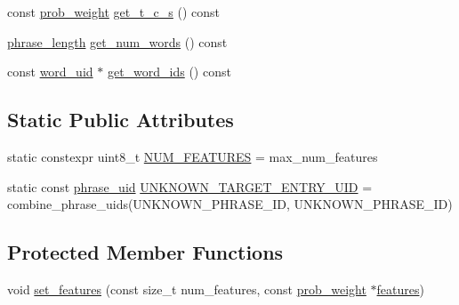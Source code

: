 \begin{DoxyCompactItemize}
\item 
const \hyperlink{namespaceuva_1_1smt_1_1bpbd_1_1server_a01e9ea4de9c226f4464862e84ff0bbcc}{prob\+\_\+weight} \hyperlink{classuva_1_1smt_1_1bpbd_1_1server_1_1tm_1_1models_1_1tm__target__entry__temp_ad971b065528c5763c4fb386db1a688b1}{get\+\_\+t\+\_\+c\+\_\+s} () const 
\item 
\hyperlink{namespaceuva_1_1smt_1_1bpbd_1_1server_af068a19c2e03116caf3e3827a3e40e35}{phrase\+\_\+length} \hyperlink{classuva_1_1smt_1_1bpbd_1_1server_1_1tm_1_1models_1_1tm__target__entry__temp_ad2a6ad83bb757e9eb4f229cd8fbbf3c1}{get\+\_\+num\+\_\+words} () const 
\item 
const \hyperlink{namespaceuva_1_1smt_1_1bpbd_1_1server_a6bfe45ba344d65a7fdd7d26156328ddc}{word\+\_\+uid} $\ast$ \hyperlink{classuva_1_1smt_1_1bpbd_1_1server_1_1tm_1_1models_1_1tm__target__entry__temp_adc2c72a44fecd698961cf8f2fcc4bb2e}{get\+\_\+word\+\_\+ids} () const 
\end{DoxyCompactItemize}
\subsection*{Static Public Attributes}
\begin{DoxyCompactItemize}
\item 
static constexpr uint8\+\_\+t \hyperlink{classuva_1_1smt_1_1bpbd_1_1server_1_1tm_1_1models_1_1tm__target__entry__temp_a573774a3d8a5e4c1c0a0ba1c00b5e7c7}{N\+U\+M\+\_\+\+F\+E\+A\+T\+U\+R\+E\+S} = max\+\_\+num\+\_\+features
\item 
static const \hyperlink{namespaceuva_1_1smt_1_1bpbd_1_1server_ad18d4cdf5504e76c22b0c124ff60b44f}{phrase\+\_\+uid} \hyperlink{classuva_1_1smt_1_1bpbd_1_1server_1_1tm_1_1models_1_1tm__target__entry__temp_adc270949b1ccda2bd58fa6950fa5ae6e}{U\+N\+K\+N\+O\+W\+N\+\_\+\+T\+A\+R\+G\+E\+T\+\_\+\+E\+N\+T\+R\+Y\+\_\+\+U\+I\+D} = combine\+\_\+phrase\+\_\+uids(U\+N\+K\+N\+O\+W\+N\+\_\+\+P\+H\+R\+A\+S\+E\+\_\+\+I\+D, U\+N\+K\+N\+O\+W\+N\+\_\+\+P\+H\+R\+A\+S\+E\+\_\+\+I\+D)
\end{DoxyCompactItemize}
\subsection*{Protected Member Functions}
\begin{DoxyCompactItemize}
\item 
void \hyperlink{classuva_1_1smt_1_1bpbd_1_1server_1_1tm_1_1models_1_1tm__target__entry__temp_a71842af251358e437e4d1f8c98b62528}{set\+\_\+features} (const size\+\_\+t num\+\_\+features, const \hyperlink{namespaceuva_1_1smt_1_1bpbd_1_1server_a01e9ea4de9c226f4464862e84ff0bbcc}{prob\+\_\+weight} $\ast$\hyperlink{feature__tests_8cxx_a1582568e32f689337602a16bf8a5bff0}{features})
\end{DoxyCompactItemize}


